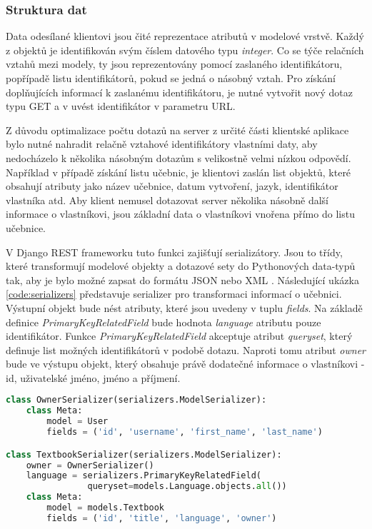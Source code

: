 \documentclass[a4paper,11pt,titlepage,fleqn]{article}
\begin{document}
        \subsubsection{Struktura dat}
            Data odesílané klientovi jsou čité reprezentace atributů v modelové vrstvě. Každý z objektů je identifikován svým číslem datového typu \textit{integer}. Co se týče relačních vztahů mezi modely, ty jsou reprezentovány pomocí zaslaného identifikátoru, popřípadě listu identifikátorů, pokud se jedná o násobný vztah. Pro získání doplňujících informací k zaslanému identifikátoru, je nutné vytvořit nový dotaz typu GET a v uvést identifikátor v parametru URL. 

            Z důvodu optimalizace počtu dotazů na server z určité části klientské aplikace bylo nutné nahradit relačně vztahové identifikátory vlastními daty, aby nedocházelo k několika násobným dotazům s velikostně velmi nízkou odpovědí. Například v případě získání listu učebnic, je klientovi zaslán list objektů, které obsahují atributy jako název učebnice, datum vytvoření, jazyk, identifikátor vlastníka atd. Aby klient nemusel dotazovat server několika násobně další informace o vlastníkovi, jsou základní data o vlastníkovi vnořena přímo do listu učebnice.

            V Django REST frameworku tuto funkci zajišťují serializátory. Jsou to třídy, které transformují modelové objekty a dotazové sety do Pythonových data-typů tak, aby je bylo možné zapsat do formátu JSON nebo XML \cite{bib:rest}. Následující ukázka \ref{code:serializers} představuje serializer pro transformaci informací o učebnici. Výstupní objekt bude nést atributy, které jsou uvedeny v tuplu \textit{fields}. Na základě definice \textit{PrimaryKeyRelatedField} bude hodnota \textit{language} atributu pouze identifikátor. Funkce \textit{PrimaryKeyRelatedField} akceptuje atribut \textit{queryset}, který definuje list možných identifikátorů v podobě dotazu. Naproti tomu atribut \textit{owner} bude ve výstupu objekt, který obsahuje právě dodatečné informace o vlastníkovi - id, uživatelské jméno, jméno a příjmení. 

\begin{lstlisting}[language=Python, caption={Serializační třída k transformaci dat o učebnici},label=code:serializers]
class OwnerSerializer(serializers.ModelSerializer):
    class Meta:
        model = User
        fields = ('id', 'username', 'first_name', 'last_name')

class TextbookSerializer(serializers.ModelSerializer):
    owner = OwnerSerializer()
    language = serializers.PrimaryKeyRelatedField(
                queryset=models.Language.objects.all())
    class Meta:
        model = models.Textbook
        fields = ('id', 'title', 'language', 'owner')
\end{lstlisting}
\end{document}

